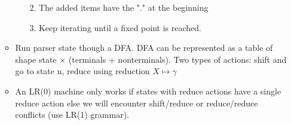 \begin{itemize}
\begin{itemize}
\begin{itemize}
			2. The added items have the "." at the beginning 
		
			3. Keep iterating until a fixed point is reached.
		\end{itemize} 
		
		\item Run parser state though a DFA. DFA can be represented as a table of shape state $\times$ (terminals + nonterminals). Two types of actions: shift and go to state n, reduce using reduction $X \mapsto \gamma$
		
		\item An LR(0) machine only works if states with reduce actions have a single reduce action else we will encounter shift/reduce or reduce/reduce conflicts (use LR(1) grammar).
	\end{itemize}
\end{itemize}



